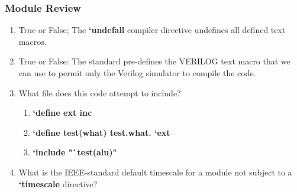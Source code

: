 \documentclass[t, notes, xcolor=table]{beamer}
\begin{document}
\begin{frame}
\frametitle{Module Review}
\begin{enumerate}
\item True or False; The \textbf{`undefall} compiler directive undefines all defined text macros.
\item True or False: The standard pre-defines the VERILOG text macro that we can use to permit only the Verilog simulator to compile the code.
\item What file does this code attempt to include?
\begin{enumerate}
	\item \textbf{`define ext inc}
	\item \textbf{`define test(what) test.what. `ext}
	\item \textbf{`include "`test(alu)"}
\end{enumerate}
\item What is the IEEE-standard default timescale for a module not subject to a \textbf{`timescale} directive?
\end{enumerate}
\end{frame}
\end{document}
